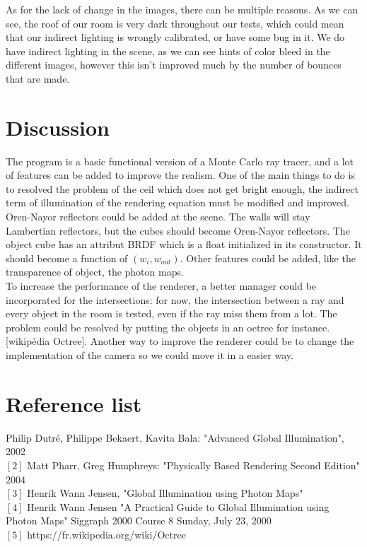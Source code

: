 \documentclass[12pt]{article}
\numberwithin{equation}{section}
\begin{document}
As for the lack of change in the images, there can be multiple reasons. As we can see, the roof of our room is very dark throughout our tests, which could mean that our indirect lighting is wrongly calibrated, or have some bug in it. We do have indirect lighting in the scene, as we can see hints of color bleed in the different images, however this isn't improved much by the number of bounces that are made.
 

\section{Discussion}

The program is a basic functional version of a Monte Carlo ray tracer, and a lot of features can be added to improve the realism. One of the main things to do is to resolved the problem of the ceil which does not get bright enough, the indirect term of illumination of the rendering equation must be modified and improved. Oren-Nayor reflectors could be added at the scene. The walls will stay Lambertian reflectors, but the cubes should become Oren-Nayor reflectors. The object cube has an attribut BRDF which is a float initialized in its constructor. It should become a function of $(w_i, w_{out})$. Other features could be added, like the transparence of object, the photon maps. \\	To increase the performance of the renderer, a better manager could be incorporated for the intersections: for now, the intersection between a ray and every object in the room is tested, even if the ray miss them from a lot. The problem could be resolved by putting the objects in an octree for instance.[wikipédia Octree]. Another way to improve the renderer could be to change the implementation of the camera so we could move it in a easier way.


\section{Reference list}
\noindent [1] Philip Dutr\'e, Philippe Bekaert, Kavita Bala: "Advanced Global Illumination", 2002\\
$[2]$ Matt Pharr, Greg Humphreys: "Physically Based Rendering Second Edition" $2004$\\
$[3]$ Henrik Wann Jensen, "Global Illumination using Photon Maps" \\
$[4]$ Henrik Wann Jensen "A Practical Guide to Global Illumination using Photon Maps" Siggraph 2000 Course 8 Sunday, July 23, $2000$\\
$[5]$ https://fr.wikipedia.org/wiki/Octree\\



\nocite{*}


\end{document}
